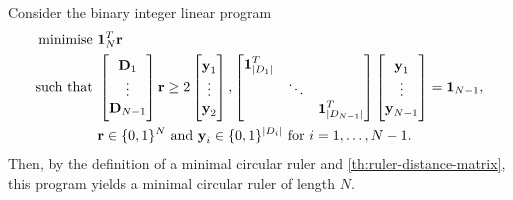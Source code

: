 \documentclass[a4paper, openany, oneside]{memoir}
\begin{document}
Consider the binary integer linear program
\begin{align*}
    \text{minimise } &\boldsymbol{\mathbf{1}}_N^T \boldsymbol{\mathbf{r}} \\
    \text{such that } &
    \begin{bmatrix}
        \boldsymbol{\mathbf{D}}_1 \\
        \vdots \\
        \boldsymbol{\mathbf{D}}_{N-1}
    \end{bmatrix} \boldsymbol{\mathbf{r}} \ge 2 \begin{bmatrix}
        \boldsymbol{\mathbf{y}}_1 \\
        \vdots \\
        \boldsymbol{\mathbf{y}}_2
    \end{bmatrix}, \begin{bmatrix}
        \boldsymbol{\mathbf{1}}_{|D_1|}^T & & \\
        & \ddots & \\
        & & \boldsymbol{\mathbf{1}}_{|D_{N-1}|}^T
    \end{bmatrix}  \begin{bmatrix}
        \boldsymbol{\mathbf{y}}_1 \\
        \vdots \\
        \boldsymbol{\mathbf{y}}_{N-1}
    \end{bmatrix} = \boldsymbol{\mathbf{1}}_{N-1}, \\
    & \boldsymbol{\mathbf{r}} \in \{0,1\}^N \text{ and } \boldsymbol{\mathbf{y}}_i \in \{0,1\}^{|D_i|} \text{ for } i = 1,\ldots,N-1.
\end{align*}
Then, by the definition of a minimal circular ruler and \cref{th:ruler-distance-matrix}, this program yields a minimal circular ruler of length $N$.
\end{document}
